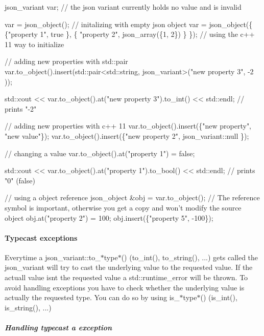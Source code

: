 \begin{DoxyCode}
json\_variant var;                               // the json variant currently holds no value and is invalid

var = json\_object();                                                                // initalizing with
       empty json object
var = json\_object(\{ \{"property 1", true \}, \{ "property 2", json\_array(\{1, 2\}) \} \}); // using the c++ 11 way
       to initialize

// adding new properties with std::pair
var.to\_object().insert(std::pair<std::string, json\_variant>("new property 3", -2 ));

std::cout << var.to\_object().at("new property 3").to\_int() << std::endl; // prints "-2"

// adding new properties with c++ 11
var.to\_object().insert(\{"new property", "new value"\});
var.to\_object().insert(\{"new property 2", json\_variant::null \});

// changing a value
var.to\_object().at("property 1") = false;

std::cout << var.to\_object().at("property 1").to\_bool() << std::endl; // prints "0" (false)

// using a object reference
json\_object &obj = var.to\_object(); // The reference symbol is important, otherwise you get a copy and
       won't modify the source object
obj.at("property 2") = 100;
obj.insert(\{"property 5", -100\});
\end{DoxyCode}


\paragraph*{\label{_typecast_exceptions_section}%
Typecast exceptions}

Everytime a {\ttfamily json\+\_\+variant\+::to\+\_\+$\ast$type$\ast$()} ({\ttfamily to\+\_\+int()}, {\ttfamily to\+\_\+string()}, ...) gets called the json\+\_\+variant will try to cast the underlying value to the requested value. If the actuall value isn\textquotesingle{}t the requested value a {\ttfamily std\+::runtime\+\_\+error} will be thrown. To avoid handling exceptions you have to check whether the underlying value is actually the requested type. You can do so by using {\ttfamily is\+\_\+$\ast$type$\ast$()} ({\ttfamily is\+\_\+int()}, {\ttfamily is\+\_\+string()}, ...)

\subparagraph*{\label{_handling_typecast_expception_section}%
Handling typecast a exception}


